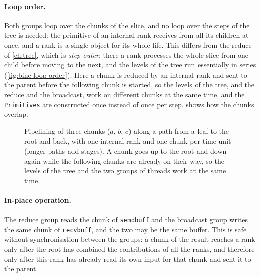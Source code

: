 \paragraph{Loop order.}
Both groups loop over the chunks of the slice, and no loop over the steps of the tree is needed: the primitive of an internal rank receives from all its children at once, and a rank is a single object for its whole life.
This differs from the reduce of \cref{ch:tree}, which is \emph{step-outer}: there a rank processes the whole slice from one child before moving to the next, and the levels of the tree run essentially in series (\cref{fig:bine-loop-order}).
Here a chunk is reduced by an internal rank and sent to the parent before the following chunk is started, so the levels of the tree, and the reduce and the broadcast, work on different chunks at the same time, and the \texttt{Primitives} are constructed once instead of once per step.
 shows how the chunks overlap.
\begin{figure}[t]
  \centering
  \caption{Pipelining of three chunks ($a$, $b$, $c$) along a path from a leaf to the
           root and back, with one internal rank and one chunk per time unit (longer
           paths add stages). A chunk goes up to the root and down again while the
           following chunks are already on their way, so the levels of the tree and the
           two groups of threads work at the same time.}
  \label{fig:tar-pipeline}
\end{figure}
\paragraph{In-place operation.}
The reduce group reads the chunk of \texttt{sendbuff} and the broadcast group writes the same chunk of \texttt{recvbuff}, and the two may be the same buffer.
This is safe without synchronisation between the groups: a chunk of the result reaches a rank only after the root has combined the contributions of all the ranks, and therefore only after this rank has already read its own input for that chunk and sent it to the parent.
